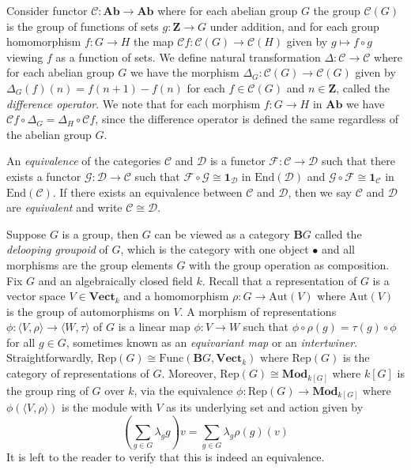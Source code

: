 \documentclass[11pt]{book}
\begin{document}
\begin{example}Consider functor $\mathscr{C}:\mathbf{Ab}\rightarrow\mathbf{Ab}$ where for each abelian group $G$ the group $\mathscr{C}(G)$ is the group of functions of sets $g:\mathbf Z\rightarrow G$ under addition, and for each group homomorphism $f:G\rightarrow H$ the map $\mathscr{C}f:\mathscr{C}(G)\rightarrow\mathscr{C}(H)$ given by $g\mapsto f\circ g$ viewing $f$ as a function of sets. We define natural transformation $\Delta:\mathscr{C}\rightarrow\mathscr{C}$ where for each abelian group $G$ we have the morphism $\Delta_G:\mathscr{C}(G)\rightarrow \mathscr{C}(G)$ given by $\Delta_G(f)(n)=f(n+1)-f(n)$ for each $f\in\mathscr{C}(G)$ and $n\in\mathbf{Z}$, called the \textit{difference operator}. We note that for each morphism $f:G\rightarrow H$ in $\mathbf{Ab}$ we have $\mathscr{C}f\circ\Delta_G=\Delta_H\circ \mathscr{C}f$, since the difference operator is defined the same regardless of the abelian group $G$.
\end{example}

\begin{definition}An \textit{equivalence} of the categories $\mathcal C$ and $\mathcal D$ is a functor $\mathscr{F}:\mathcal C\rightarrow\mathcal D$ such that there exists a functor $\mathscr{G}:\mathcal D\rightarrow \mathcal{C}$ such that $\mathscr{F}\circ\mathscr{G}\cong \mathbf 1_{\mathcal D}$ in $\mathrm{End}(\mathcal D)$ and $\mathscr{G}\circ\mathscr{F}\cong \mathbf 1_{\mathcal C}$ in $\mathrm{End}(\mathcal C)$. If there exists an equivalence between $\mathcal C$ and $\mathcal D$, then we say $\mathcal C$ and $\mathcal D$ are \textit{equivalent} and write $\mathcal C\cong \mathcal D$.
\end{definition}
\begin{example}Suppose $G$ is a group, then $G$ can be viewed as a category $\mathbf BG$ called the \textit{delooping groupoid} of $G$, which is the category with one object $\bullet$ and all morphisms are the group elements $G$ with the group operation as composition. Fix $G$ and an algebraically closed field $k$. Recall that a representation of $G$ is a vector space $V\in\mathbf{Vect}_k$ and a homomorphism $\rho:G\rightarrow\mathrm{Aut}(V)$ where $\mathrm{Aut}(V)$ is the group of automorphisms on $V$. A morphism of representations $\phi:\langle V,\rho\rangle\rightarrow \langle W,\tau\rangle$ of $G$ is a linear map $\phi:V\rightarrow W$ such that $\phi\circ\rho(g)=\tau(g)\circ\phi$ for all $g\in G$, sometimes known as an \textit{equivariant map} or an \textit{intertwiner}. Straightforwardly, $\mathrm{Rep}(G)\cong \mathrm{Func}(\mathbf BG,\mathbf{Vect}_k)$ where $\mathrm{Rep}(G)$ is the category of representations of $G$. Moreover, $\mathrm{Rep}(G)\cong \mathbf{Mod}_{k[G]}$ where $k[G]$ is the group ring of $G$ over $k$, via the equivalence $\phi:\mathrm{Rep}(G)\rightarrow \mathbf{Mod}_{k[G]}$ where $\phi(\langle V,\rho\rangle)$ is the module with $V$ as its underlying set and action given by 
\[\left(\sum_{g \in G} \lambda_{g} g\right) v=\sum_{g \in G} \lambda_{g} \rho(g)(v)\]
It is left to the reader to verify that this is indeed an equivalence.
\end{example}
\end{document}
